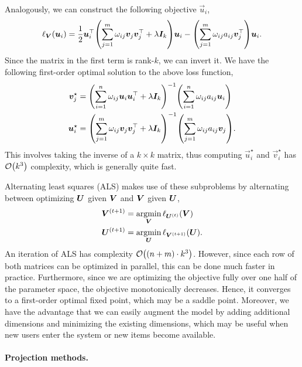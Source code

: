 Analogously, we can construct the following objective \wrt $\vec{u}_i$, \[
    \ell_{\mat{V}}(\vec{u}_i) = \frac{1}{2} \transpose{\vec{u}_i} \lft( \sum_{j=1}^{m} \omega_{ij} \vec{v}_j \transpose{\vec{v}_j} + \lambda \mat{I}_k \rgt) \vec{u}_i - \lft( \sum_{j=1}^{m} \omega_{ij} a_{ij} \transpose{\vec{v}_j} \rgt) \vec{u}_i.
\]
Since the matrix in the first term is rank-$k$, we can invert it. We have the following first-order
optimal solution to the above loss function,
\begin{align*}
    \vec{v}_j^\star & = \inv{\lft( \sum_{i=1}^{n} \omega_{ij} \vec{u}_i \transpose{\vec{u}_i} + \lambda \mat{I}_k \rgt)} \lft( \sum_{i=1}^{n} \omega_{ij} a_{ij} \vec{u}_i \rgt)  \\
    \vec{u}_i^\star & = \inv{\lft( \sum_{j=1}^{m} \omega_{ij} \vec{v}_j \transpose{\vec{v}_j} + \lambda \mat{I}_k \rgt)} \lft( \sum_{j=1}^{m} \omega_{ij} a_{ij} \vec{v}_j \rgt).
\end{align*}
This involves taking the inverse of a $k\times k$ matrix, thus computing $\vec{u}_i^\star$ and
$\vec{v}_i^\star$ has $\bigo{k^3}$ complexity, which is generally quite fast.

Alternating least squares (ALS) makes use of these subproblems by alternating between optimizing
$\bm{U}$ given $\bm{V}$ and $\bm{V}$ given $\bm{U}$,
\begin{align*}
    \bm{V}^{(t+1)} & = \operatorname*{argmin}_{\bm{V}} \ell_{\bm{U}^{(t)}}(\bm{V})    \\
    \bm{U}^{(t+1)} & = \operatorname*{argmin}_{\bm{U}} \ell_{\bm{V}^{(t+1)}}(\bm{U}).
\end{align*}
An iteration of ALS has complexity $\bigo{(n+m)\cdot k^3}$. However, since each row of both matrices can be
optimized in parallel, this can be done much faster in practice. Furthermore, since we are optimizing
the objective fully over one half of the parameter space, the objective monotonically decreases.
Hence, it converges to a first-order optimal fixed point, which may be a saddle point. Moreover, we
have the advantage that we can easily augment the model by adding additional dimensions and minimizing \wrt the existing dimensions, which may be
useful when new users enter the system or new items become available.

\paragraph{Projection methods.}

